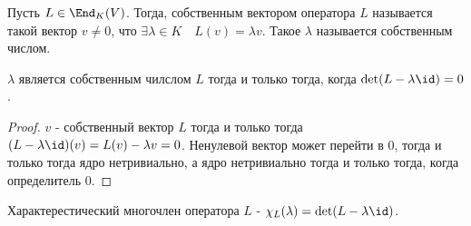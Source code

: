 \begin{definition} \thmslashn 

    Пусть $L\in \End_{K}(V)$. Тогда, собственным вектором оператора $L$ называется такой вектор $v \neq 0$, что $\exists{\lambda\in K}\quad L(v) = \lambda v$. Такое $\lambda$ называется собственным числом.
\end{definition}
\begin{lemma} \thmslashn

    $\lambda$ является собственным чилслом $L$ тогда и только тогда, когда $\det(L - \lambda\id) = 0$.
    \begin{proof} \thmslashn
    
        $v$ - собственный вектор $L$ тогда и только тогда $(L - \lambda\id)(v) = L(v) - \lambda v = 0$. Ненулевой вектор может перейти в $0$, тогда и только тогда ядро нетривиально, а ядро нетривиально тогда и только тогда, когда определитель $0$.
    \end{proof}
\end{lemma}
\begin{definition} \thmslashn 

    Характерестический многочлен оператора $L$ - $\chi_{L}(\lambda) = \det(L - \lambda\id)$.
\end{definition}
